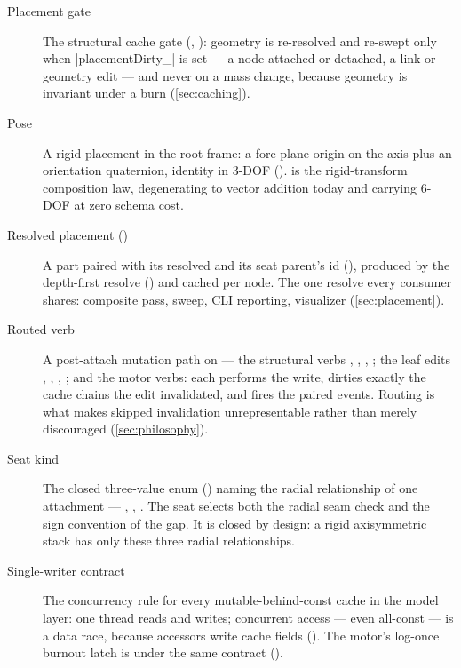 \begin{description}
\item[Placement gate] The structural cache gate
  (, ):
  geometry is re-resolved and re-swept only when \cppinline|placementDirty_| is set ---
  a node attached or detached, a link or geometry edit --- and never on a mass change,
  because geometry is invariant under a burn (\cref{sec:caching}).

\item[Pose] A rigid placement in the root frame: a fore-plane origin on the axis plus an
  orientation quaternion, identity in 3-DOF
  ().  is the rigid-transform
  composition law, degenerating to vector addition today and carrying 6-DOF at zero
  schema cost.

\item[Resolved placement ()] A part paired with its resolved 
  and its seat parent's id (), produced by the
  depth-first resolve  () and
  cached per node. The one resolve every consumer shares: composite pass, sweep, CLI
  reporting, visualizer (\cref{sec:placement}).

\item[Routed verb] A post-attach mutation path on  --- the structural
  verbs , , , ; the leaf
  edits , , , ;
  and the motor verbs: each performs the write, dirties exactly the cache chains the edit
  invalidated, and fires the paired events. Routing is what makes skipped invalidation
  unrepresentable rather than merely discouraged (\cref{sec:philosophy}).

\item[Seat kind] The closed three-value enum 
  () naming the radial relationship of one
  attachment --- , , . The seat selects both
  the radial seam check and the sign convention of the gap. It is closed by design: a
  rigid axisymmetric stack has only these three radial relationships.

\item[Single-writer contract] The concurrency rule for every mutable-behind-const cache
  in the model layer: one thread reads and writes; concurrent access --- even all-const
  --- is a data race, because  accessors write cache fields
  (). The motor's log-once burnout latch is under the
  same contract ().


\end{description}
